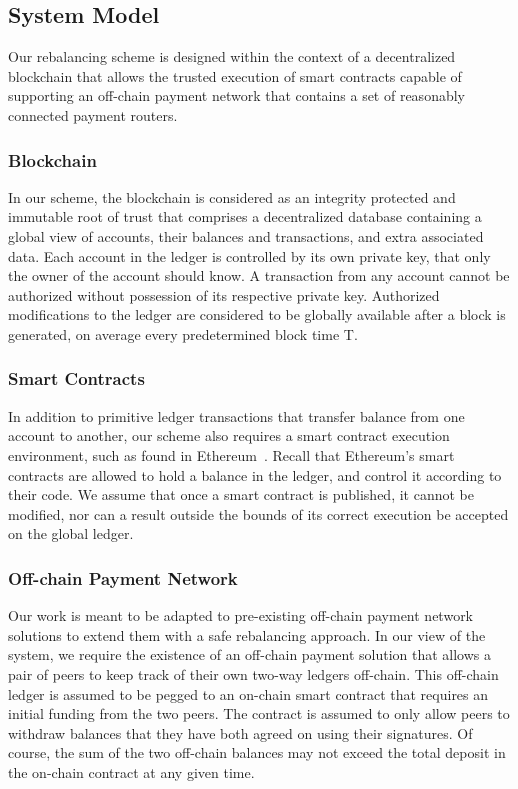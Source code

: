 \documentclass[sigconf]{acmart}
\begin{document}
\subsection{System Model}
Our rebalancing scheme is designed within the context of a decentralized blockchain that allows the trusted execution of smart contracts capable of supporting an off-chain payment network that contains a set of reasonably connected payment routers.

\subsubsection{Blockchain}
In our scheme, the blockchain is considered as an integrity protected and immutable root of trust that comprises a decentralized database containing a global view of accounts, their balances and transactions, and extra associated data.
Each account in the ledger is controlled by its own private key, that only the owner of the account should know. A transaction from any account cannot be authorized without possession of its respective private key.
Authorized modifications to the ledger are considered to be globally available after a block is generated, on average every predetermined block time T.

\subsubsection{Smart Contracts}
In addition to primitive ledger transactions that transfer balance from one account to another, our scheme also requires a smart contract execution environment, such as found in Ethereum~\cite{wood2014ethereum}.
Recall that Ethereum's smart contracts are allowed to hold a balance in the ledger, and control it according to their code.
We assume that once a smart contract is published, it cannot be modified, nor can a result outside the bounds of its correct execution be accepted on the global ledger.

\subsubsection{Off-chain Payment Network}
Our work is meant to be adapted to pre-existing off-chain payment network solutions to extend them with a safe rebalancing approach.
In our view of the system, we require the existence of an off-chain payment solution that allows a pair of peers to keep track of their own two-way ledgers off-chain. This off-chain ledger is assumed to be pegged to an on-chain smart contract that requires an initial funding from the two peers.
The contract is assumed to only allow peers to withdraw balances that they have both agreed on using their signatures. Of course, the sum of the two off-chain balances may not exceed the total deposit in the on-chain contract at any given time.
\end{document}
